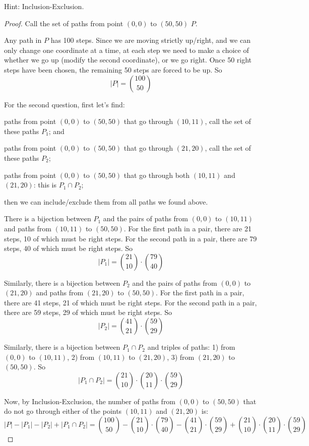 \documentclass[14pt]{extarticle}
\begin{document}
Hint: Inclusion-Exclusion.
\begin{proof}
Call the set of paths from point $(0,0)$ to $(50,50)$ $P$. 

Any path in $P$ has 100 steps. Since we are moving strictly up/right, and we can only change one coordinate at a time, at each step we need to make a choice of whether we go up (modify the second coordinate), or we go right. Once 50 right steps have been chosen, the remaining 50 steps are forced to be up. So 
$$
|P| = \binom{100}{50}
$$

For the second question, first let's find: 

paths from point $(0,0)$ to $(50,50)$ that go through $(10,11)$, call the set of these paths $P_1$; and 

paths from point $(0,0)$ to $(50,50)$ that go through $(21,20)$, call the set of these paths $P_2$; 

paths from point $(0,0)$ to $(50,50)$ that go through both $(10,11)$ and $(21,20)$: this is $P_1 \cap P_2$;

then we can include/exclude them from all paths we found above.

There is a bijection between $P_1$ and the pairs of paths from $(0,0)$ to $(10,11)$ and paths from $(10,11)$ to $(50,50)$. For the first path in a pair, there are 21 steps, 10 of which must be right steps. For the second path in a pair, there are 79 steps, 40 of which must be right steps. So
$$
|P_1| = \binom{21}{10} \cdot \binom{79}{40}
$$

Similarly, there is a bijection between $P_2$ and the pairs of paths from $(0,0)$ to $(21,20)$ and paths from $(21,20)$ to $(50,50)$. For the first path in a pair, there are 41 steps, 21 of which must be right steps. For the second path in a pair, there are 59 steps, 29 of which must be right steps. So
$$
|P_2| = \binom{41}{21} \cdot \binom{59}{29}
$$

Similarly, there is a bijection between $P_1 \cap P_2$ and triples of paths: 1) from $(0,0)$ to $(10,11)$, 2) from $(10, 11)$ to $(21,20)$, 3) from $(21,20)$ to $(50,50)$. So
$$
|P_1 \cap P_2| = \binom{21}{10} \cdot \binom{20}{11} \cdot \binom{59}{29}
$$

Now, by Inclusion-Exclusion, the number of paths from $(0,0)$ to $(50,50)$ that do not go through either of the points $(10,11)$ and $(21,20)$ is:
$$
|P| - |P_1| - |P_2| + |P_1\cap P_2| = \binom{100}{50} - \binom{21}{10} \cdot \binom{79}{40} - \binom{41}{21} \cdot \binom{59}{29} + \binom{21}{10} \cdot \binom{20}{11} \cdot \binom{59}{29}
$$
\end{proof}
\end{document}
